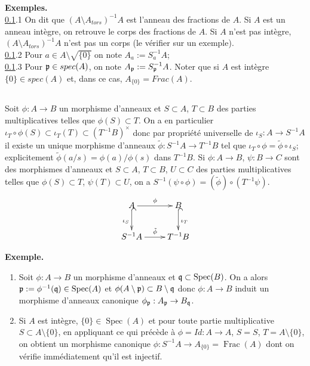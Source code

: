 \documentclass[a4paper, oneside, 12pt]{book}
\theoremstyle{definition} %
\DeclareMathOperator{\Spec}{Spec}
\DeclareMathOperator{\Frac}{Frac}
\begin{document}
 
 
 \subsection{}\label{LocEx2}\textbf{Exemples.}\\

\ref{LocEx2}.1 On dit que $(A\setminus A_{tors})^{-1}A$ est l'anneau des fractions de $A$. Si $A$ est un anneau intègre, on retrouve le corps  des fractions de $A$. Si $A$ n'est pas intègre, $(A\setminus A_{tors})^{-1}A$ n'est pas un corps (le vérifier sur un exemple).\\

\ref{LocEx2}.2 Pour $a\in A\setminus \sqrt{\lbrace 0\rbrace}$ on note $A_a:=S_a^{-1}A $;\\

\ref{LocEx2}.3 Pour $\frak{p}\in spec(A)$, on note $A_\frak{p}:=S_{\frak{p}}^{-1}A$. Noter que si $A$ est intègre  $\lbrace 0\rbrace \in spec(A)$ et, dans ce cas, $A_{\lbrace 0\rbrace}=Frac(A)$.\\

 \subsection{}\label{LocMorphismes}Soit $\phi:A\rightarrow B$ un morphisme d'anneaux et $S\subset A$, $T\subset B$ des parties multiplicatives telles que $\phi(S)\subset T$. On a en particulier $\iota_T\circ \phi(S)\subset \iota_T(T)\subset (T^{-1}B)^\times$ donc par propriété universelle de $\iota_S:A\rightarrow S^{-1}A$ il existe un unique morphisme d'anneaux $\tilde{\phi}:S^{-1}A\rightarrow T^{-1}B$ tel que $\iota_T\circ \phi=\tilde{\phi}\circ \iota_S$; explicitement $\tilde{\phi}(a/s)=\phi(a)/\phi(s)$ dans $T^{-1}B$. Si $\phi:A\rightarrow B$, $\psi:B\rightarrow C$ sont des morphismes d'anneaux et $S\subset A$, $T\subset B$, $U\subset C$ des parties multiplicatives telles que $\phi(S)\subset T$, $\psi(T)\subset U$, on a $S^{-1}(\psi\circ \phi)=(\tilde{\phi})\circ (T^{-1}\psi)$. \\

	$$\xymatrix{
		A \ar[r]^\phi \ar@{^{(}->}[d]_{\iota_S} & B \ar@{^{(}->}[d]^{\iota_T} \\
		S^{-1}A \ar[r]^{\tilde{\phi}} & T^{-1}B 
	}$$

\textbf{Exemple.} 

\begin{enumerate}
\item Soit $\phi:A\rightarrow B$ un morphisme d'anneaux et $\frak{q}\subset \Spec(B)$. On a alors $\frak{p}:=\phi^{-1}(\frak{q})\in \Spec(A)$ et $\phi(A\setminus \frak{p})\subset B\setminus \frak{q}$ donc $\phi:A\rightarrow B$ induit un morphisme d'anneaux canonique $\phi_\frak{p}:A_{\frak{p}}\rightarrow B_{\frak{q}}$. 
 \item Si $A$ est intègre,  $\lbrace 0\rbrace\in \Spec(A)$ et pour toute partie multiplicative $S\subset A\setminus \lbrace 0\rbrace$, en appliquant ce qui précède à $\phi=Id:A\rightarrow A$, $S=S$, $T=A\setminus \lbrace 0\rbrace$, on obtient un morphisme canonique $\phi:S^{-1}A\rightarrow A_{\lbrace 0\rbrace}=\Frac(A)$ dont on vérifie immédiatement qu'il est injectif. 
\end{enumerate}
\end{document}
